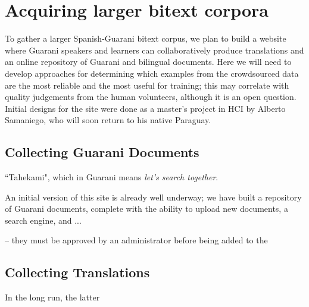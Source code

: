 \section{Acquiring larger bitext corpora}
To gather a larger Spanish-Guarani bitext corpus, we plan to build a website
where Guarani speakers and learners can collaboratively produce translations
and an online repository of Guarani and bilingual documents.  Here we will need
to develop approaches for determining which examples from the crowdsourced data
are the most reliable and the most useful for training; this may correlate
with quality judgements from the human volunteers, although it is an open
question. Initial designs for the site were done as a master's project in HCI
by Alberto Samaniego, who will soon return to his native Paraguay.

\subsection{Collecting Guarani Documents}
``Tahekami", which in Guarani means \emph{let's search together}.

An initial version of this site is already well underway; we have built a
repository of Guarani documents, complete with the ability to upload new
documents, a search engine, and ...

-- they must be approved by an administrator before being added to
the 

\subsection{Collecting Translations}

In the long run, the latter 
